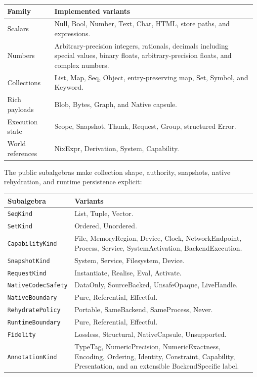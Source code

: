 \documentclass[11pt,oneside]{article}
\begin{document}
\begin{longtable}{P{0.20\textwidth} P{0.72\textwidth}}
\toprule
\textbf{Family} & \textbf{Implemented variants} \\
\midrule
\endhead
Scalars &
Null, Bool, Number, Text, Char, HTML, store paths, and expressions. \\
Numbers &
Arbitrary-precision integers, rationals, decimals including special values, binary
floats, arbitrary-precision floats, and complex numbers. \\
Collections &
List, Map, Seq, Object, entry-preserving map, Set, Symbol, and Keyword. \\
Rich payloads &
Blob, Bytes, Graph, and Native capsule. \\
Execution state &
Scope, Snapshot, Thunk, Request, Group, structured Error. \\
World references &
NixExpr, Derivation, System, Capability. \\
\bottomrule
\end{longtable}

The public subalgebras make collection shape, authority, snapshots, native
rehydration, and runtime persistence explicit:

\begin{longtable}{P{0.24\textwidth} P{0.68\textwidth}}
\toprule
\textbf{Subalgebra} & \textbf{Variants} \\
\midrule
\endhead
\texttt{SeqKind} & List, Tuple, Vector. \\
\texttt{SetKind} & Ordered, Unordered. \\
\texttt{CapabilityKind} & File, MemoryRegion, Device, Clock,
NetworkEndpoint, Process, Service, SystemActivation, BackendExecution. \\
\texttt{SnapshotKind} & System, Service, Filesystem, Device. \\
\texttt{RequestKind} & Instantiate, Realise, Eval, Activate. \\
\texttt{NativeCodecSafety} & DataOnly, SourceBacked, UnsafeOpaque, LiveHandle. \\
\texttt{NativeBoundary} & Pure, Referential, Effectful. \\
\texttt{RehydratePolicy} & Portable, SameBackend, SameProcess, Never. \\
\texttt{RuntimeBoundary} & Pure, Referential, Effectful. \\
\texttt{Fidelity} & Lossless, Structural, NativeCapsule, Unsupported. \\
\texttt{AnnotationKind} & TypeTag, NumericPrecision, NumericExactness,
Encoding, Ordering, Identity, Constraint, Capability, Presentation, and an
extensible BackendSpecific label. \\
\bottomrule
\end{longtable}
\end{document}
